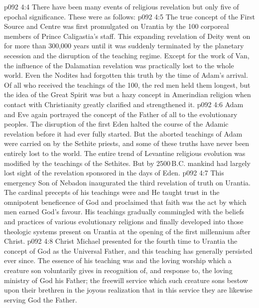 \vs p092 4:4 \pc There have been many events of religious revelation but only five of epochal significance. These were as follows:
\vs p092 4:5 \bibnobreakspace {} The true concept of the First Source and Centre was first promulgated on Urantia by the 100 corporeal members of Prince Caligastia’s staff. This expanding revelation of Deity went on for more than 300,000 years until it was suddenly terminated by the planetary secession and the disruption of the teaching regime. Except for the work of Van, the influence of the Dalamatian revelation was practically lost to the whole world. Even the Nodites had forgotten this truth by the time of Adam’s arrival. Of all who received the teachings of the 100, the red men held them longest, but the idea of the Great Spirit was but a hazy concept in Amerindian religion when contact with Christianity greatly clarified and strengthened it.
\vs p092 4:6 \bibnobreakspace {} Adam and Eve again portrayed the concept of the Father of all to the evolutionary peoples. The disruption of the first Eden halted the course of the Adamic revelation before it had ever fully started. But the aborted teachings of Adam were carried on by the Sethite priests, and some of these truths have never been entirely lost to the world. The entire trend of Levantine religious evolution was modified by the teachings of the Sethites. But by 2500\,B.C. mankind had largely lost sight of the revelation sponsored in the days of Eden.
\vs p092 4:7 \bibnobreakspace {} This emergency Son of Nebadon inaugurated the third revelation of truth on Urantia. The cardinal precepts of his teachings were  and  He taught trust in the omnipotent beneficence of God and proclaimed that faith was the act by which men earned God’s favour. His teachings gradually commingled with the beliefs and practices of various evolutionary religions and finally developed into those theologic systems present on Urantia at the opening of the first millennium after Christ.
\vs p092 4:8 \bibnobreakspace {} Christ Michael presented for the fourth time to Urantia the concept of God as the Universal Father, and this teaching has generally persisted ever since. The essence of his teaching was  and  the loving worship which a creature son voluntarily gives in recognition of, and response to, the loving ministry of God his Father; the freewill service which such creature sons bestow upon their brethren in the joyous realization that in this service they are likewise serving God the Father.
